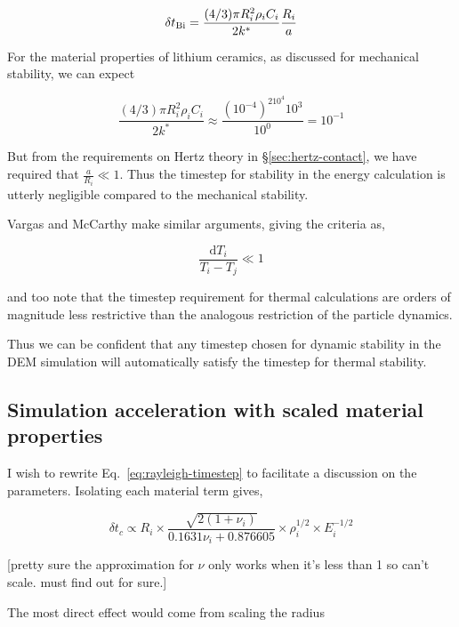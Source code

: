 \begin{equation}
	\delta t_{\mathrm{Bi}} = \frac{(4/3)\pi R_i^2\rho_i C_i}{2k^*}\frac{R_i}{a}
\end{equation}

For the material properties of lithium ceramics, as discussed for mechanical stability, we can expect

\begin{equation*}
	\frac{(4/3)\pi R_i^2\rho_i C_i}{2k^*} \approx \frac{(10^{-4})^210^{4}10^3}{10^0} = 10^{-1}
\end{equation*}

But from the requirements on Hertz theory in \S\ref{sec:hertz-contact}, we have required that $\frac{a}{R_i} \ll 1$. Thus the timestep for stability in the energy calculation is utterly negligible compared to the mechanical stability.

Vargas and McCarthy\cite{Vargas2001} make similar arguments, giving the criteria as,

\begin{equation}
	\frac{\mathrm{d}T_i}{T_i - T_j} \ll 1
\end{equation}

and too note that the timestep requirement for thermal calculations are orders of magnitude less restrictive than the analogous restriction of the particle dynamics.

Thus we can be confident that any timestep chosen for dynamic stability in the DEM simulation will automatically satisfy the timestep for thermal stability.





\subsection{Simulation acceleration with scaled material properties}
I wish to rewrite Eq.~\ref{eq:rayleigh-timestep} to facilitate a discussion on the parameters. Isolating each material term gives, 

\begin{equation}
	\delta t_c \propto R_i \times \frac{\sqrt{2(1+\nu_i)}}{0.1631 \nu_i + 0.876605}  \times \rho_i^{1/2} \times E_i^{-1/2}
\end{equation}

[pretty sure the approximation for $\nu$ only works when it's less than 1 so can't scale. must find out for sure.]

The most direct effect would come from scaling the radius 




